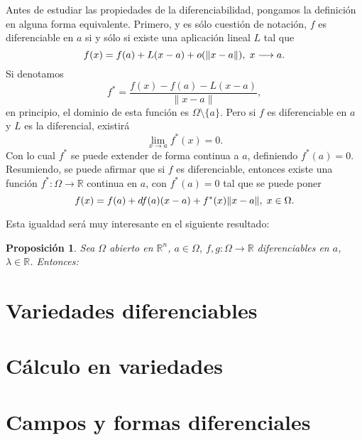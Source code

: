 \documentclass[12pt]{article}
\newtheorem{proposition}[theorem]{Proposición}
\providecommand{\norm}[1]{\lVert#1\rVert}
\begin{document}
Antes de estudiar las propiedades de la diferenciabilidad, pongamos la definición en alguna forma equivalente. Primero, y es sólo cuestión de notación, $f$ es diferenciable en $a$ si y sólo si existe una aplicación lineal $L$ tal que $$f(x)=f(a)+L(x-a)+o(\norm{x-a}), \hspace{0.1cm} x \longrightarrow a.$$
Si denotamos $$f^{\ast} = \dfrac{f(x)-f(a)-L(x-a)}{\norm{x-a}},$$ en principio, el dominio de esta función es $\Omega \setminus \lbrace a \rbrace$. Pero si $f$ es diferenciable en $a$ y $L$ es la diferencial, existirá $$\lim_{x \rightarrow a} f^{\ast}(x) = 0.$$ 
Con lo cual $f^{\ast}$ se puede extender de forma continua a $a$, definiendo $f^{\ast}(a)=0$. Resumiendo, se puede afirmar que si $f$ es diferenciable, entonces existe una función $f^{\ast} \colon \Omega \longrightarrow \mathbb{R}$ continua en $a$, con $f^{\ast}(a)=0$ tal que se puede poner $$f(x) = f(a) + df(a)(x-a) + f^{\ast}(x)\norm{x-a}, \hspace{0.1cm} x \in \Omega.$$

Esta igualdad será muy interesante en el siguiente resultado: 

\begin{proposition}
Sea $\Omega$ abierto en $\mathbb{R}^n$, $a \in \Omega$, $f,g \colon \Omega \longrightarrow \mathbb{R}$ diferenciables en $a$, $\lambda \in \mathbb{R}$. Entonces: 
\end{proposition}

\section{Variedades diferenciables}
\section{Cálculo en variedades}
\section{Campos y formas diferenciales}
\end{document}
